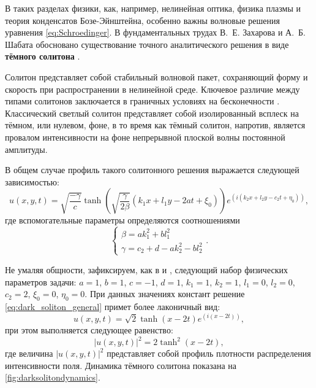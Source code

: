 В таких разделах физики, как, например, нелинейная оптика, физика плазмы и теория конденсатов Бозе-Эйнштейна, особенно важны волновые решения уравнения \eqref{eq:Schroedinger}. В фундаментальных трудах В.~Е. Захарова и А.~Б. Шабата обосновано существование точного аналитического решения в виде \textbf{тёмного солитона} \cite{Kivshar2005}. %

Солитон представляет собой стабильный волновой пакет, сохраняющий форму и скорость при распространении в нелинейной среде. Ключевое различие между типами солитонов заключается в граничных условиях на бесконечности \cite{Kivshar2005}. Классический светлый солитон представляет собой изолированный всплеск на тёмном, или нулевом, фоне, в то время как тёмный солитон, напротив, является провалом интенсивности на фоне непрерывной плоской волны постоянной амплитуды.

В общем случае профиль такого солитонного решения выражается следующей зависимостью:
\begin{equation} \label{eq:dark_soliton_general}
	u(x, y, t) = \sqrt{\frac{-\gamma}{c}} \tanh\left( \sqrt{\frac{\gamma}{2\beta}} (k_1 x + l_1 y - 2at + \xi_0) \right) e^{\left(i(k_2 x + l_2 y - c_2 t + \eta_0)\right)},
\end{equation}
где вспомогательные параметры определяются соотношениями 
\begin{equation*}
	\begin{cases}
		\beta = a k_1^2 + b l_1^2 \\
		\gamma = c_2 + d - a k_2^2 - b l_2^2
	\end{cases}.
\end{equation*}

Не умаляя общности, зафиксируем, как в \cite{Anastassi2023} и \cite{Feng2018}, следующий набор физических параметров задачи: $a = 1$, $b = 1$, $c = -1$, $d = 1$, $k_1 = 1$, $k_2 = 1$, $l_1 = 0$, $l_2 = 0$, $c_2 = 2$, $\xi_0 = 0$, $\eta_0 = 0$. При данных значениях констант решение \eqref{eq:dark_soliton_general} примет более лаконичный вид:
\begin{equation*}
	u(x, y, t) = \sqrt{2} \tanh(x - 2t) e^{\left(i(x - 2t)\right)},
\end{equation*}
при этом выполняется следующее равенство:
\begin{equation*}
	|u(x, y, t)|^2 = 2 \tanh^2(x - 2t),
\end{equation*}
где величина $|u(x, y, t)|^2$ представляет собой профиль плотности распределения интенсивности поля. Динамика тёмного солитона показана на \autoref{fig:darksolitondynamics}.


